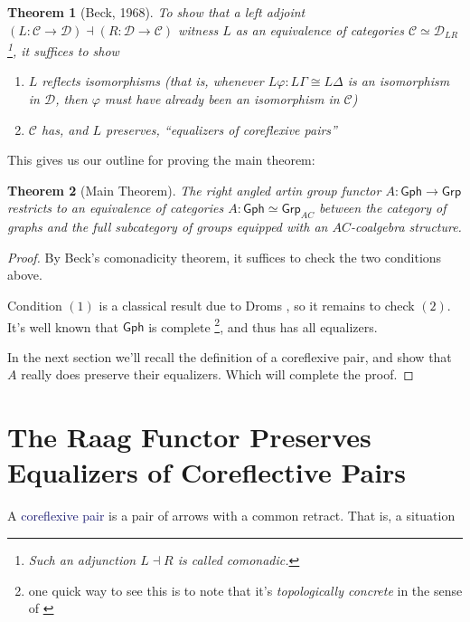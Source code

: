 \documentclass[12pt]{article}
\newtheorem*{thm*}{Theorem}
\theoremstyle{definition}
\theoremstyle{theorem}
\newcommand*{\catFont}[1]{\mathsf{#1}}
\newcommand*{\catVarFont}[1]{\mathcal{#1}}
\newcommand{\Grp}{\catFont{Grp}}
\newcommand{\catC}{\catVarFont{C}}
\newcommand{\catD}{\catVarFont{D}}
\newcommand*{\important}[1]{\textcolor{MidnightBlue}{#1}}
\newcommand{\Gph}{\mathsf{Gph}}
\begin{document}
\begin{thm*}[Beck, 1968]
  To show that a left adjoint
  $(L : \catC \to \catD) \dashv (R : \catD \to \catC)$ 
  witness $L$ as an equivalence of categories $\catC \simeq \catD_{LR}$%
  \footnote{Such an adjunction $L \dashv R$ is called \emph{comonadic}.},
  it suffices to show

  \begin{enumerate}
      \item $L$ reflects isomorphisms (that is, whenever 
        $L \varphi : L\Gamma \cong L\Delta$ is an isomorphism in $\catD$, 
        then $\varphi$ must have already been an isomorphism in $\catC$)
      \item $\catC$ has, and $L$ preserves, ``equalizers of coreflexive pairs''
  \end{enumerate}
\end{thm*}

This gives us our outline for proving the main theorem:

\begin{thm*}[Main Theorem]
  The right angled artin group functor $A : \Gph \to \Grp$ restricts to 
  an equivalence of categories $A : \Gph \simeq \Grp_{AC}$ between the 
  category of graphs and the full subcategory of groups equipped with an 
  $AC$-coalgebra structure.
\end{thm*}

\begin{proof}
  By Beck's comonadicity theorem, it suffices to check the two conditions 
  above.

  Condition $(1)$ is a classical result due to Droms 
  \cite{dromsIsomorphismsGraphGroups1987}, 
  so it remains to check $(2)$. It's well known that $\mathsf{Gph}$
  is complete%
  \footnote{one quick way to see this is to note that it's \emph{topologically concrete}
  in the sense of \cite{adamekAbstractConcreteCategories2009}}, and thus has all equalizers. 

  In the next section we'll recall the definition of a coreflexive pair, 
  and show that $A$ really does preserve their equalizers. Which will 
  complete the proof.
\end{proof}

\section{The Raag Functor Preserves Equalizers of Coreflective Pairs}
\label{proof}

A \important{coreflexive pair} is a pair of arrows with a common retract. 
That is, a situation
\end{document}
